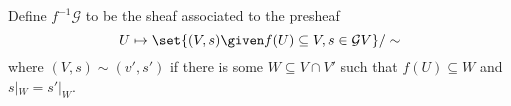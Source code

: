 Define  $f^{-1}\mathcal{G}$ to be the sheaf associated to the presheaf
\[ U\mapsto \set{(V, s)\given f(U) \subseteq V, s \in \mathcal{G}V}/\sim \]
where $(V, s)\sim (v', s')$ if there is some $W \subseteq V\cap V'$ such that
$f(U) \subseteq W$ and $s|_W = s'|_W$.
